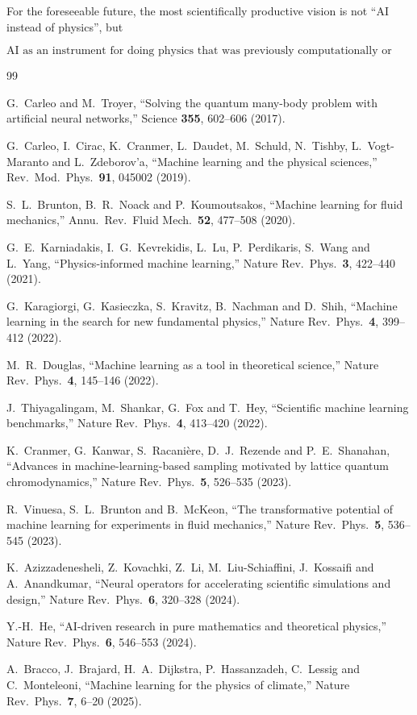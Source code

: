 \documentclass[11pt,a4paper]{article}
\begin{document}
For the foreseeable future, the most scientifically productive vision is not
``AI instead of physics'', but

\begin{equation}
\boxed{
\text{AI as an instrument for doing physics that was previously
computationally or conceptually inaccessible.}
}
\end{equation}

\begin{thebibliography}{99}

G.~Carleo and M.~Troyer,
``Solving the quantum many-body problem with artificial neural networks,''
Science \textbf{355}, 602--606 (2017).

G.~Carleo, I.~Cirac, K.~Cranmer, L.~Daudet, M.~Schuld, N.~Tishby,
L.~Vogt-Maranto and L.~Zdeborov'a,
``Machine learning and the physical sciences,''
Rev.\ Mod.\ Phys.\ \textbf{91}, 045002 (2019).

S.~L.~Brunton, B.~R.~Noack and P.~Koumoutsakos,
``Machine learning for fluid mechanics,''
Annu.\ Rev.\ Fluid Mech.\ \textbf{52}, 477--508 (2020).

G.~E.~Karniadakis, I.~G.~Kevrekidis, L.~Lu, P.~Perdikaris,
S.~Wang and L.~Yang,
``Physics-informed machine learning,''
Nature Rev.\ Phys.\ \textbf{3}, 422--440 (2021).

G.~Karagiorgi, G.~Kasieczka, S.~Kravitz, B.~Nachman and D.~Shih,
``Machine learning in the search for new fundamental physics,''
Nature Rev.\ Phys.\ \textbf{4}, 399--412 (2022).

M.~R.~Douglas,
``Machine learning as a tool in theoretical science,''
Nature Rev.\ Phys.\ \textbf{4}, 145--146 (2022).

J.~Thiyagalingam, M.~Shankar, G.~Fox and T.~Hey,
``Scientific machine learning benchmarks,''
Nature Rev.\ Phys.\ \textbf{4}, 413--420 (2022).

K.~Cranmer, G.~Kanwar, S.~Racani\`ere, D.~J.~Rezende and
P.~E.~Shanahan,
``Advances in machine-learning-based sampling motivated by lattice quantum
chromodynamics,''
Nature Rev.\ Phys.\ \textbf{5}, 526--535 (2023).

R.~Vinuesa, S.~L.~Brunton and B.~McKeon,
``The transformative potential of machine learning for experiments in fluid
mechanics,''
Nature Rev.\ Phys.\ \textbf{5}, 536--545 (2023).

K.~Azizzadenesheli, Z.~Kovachki, Z.~Li, M.~Liu-Schiaffini,
J.~Kossaifi and A.~Anandkumar,
``Neural operators for accelerating scientific simulations and design,''
Nature Rev.\ Phys.\ \textbf{6}, 320--328 (2024).

Y.-H.~He,
``AI-driven research in pure mathematics and theoretical physics,''
Nature Rev.\ Phys.\ \textbf{6}, 546--553 (2024).

A.~Bracco, J.~Brajard, H.~A.~Dijkstra, P.~Hassanzadeh,
C.~Lessig and C.~Monteleoni,
``Machine learning for the physics of climate,''
Nature Rev.\ Phys.\ \textbf{7}, 6--20 (2025).

\end{thebibliography}
\end{document}
